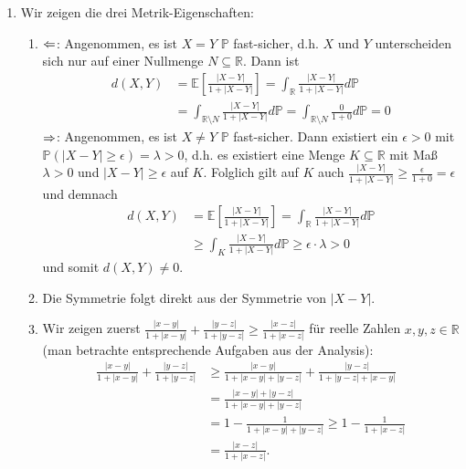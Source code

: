 \documentclass[a4paper]{article}
\begin{document}
\begin{enumerate}[label=(\alph*)]
    \item Wir zeigen die drei Metrik-Eigenschaften:
    \begin{enumerate}[label=(\roman*)]
        \item $\Leftarrow$: Angenommen, es ist $X = Y$ $\mathds{P}$ fast-sicher, d.h. $X$ und $Y$ unterscheiden sich nur auf einer Nullmenge $N \subseteq \mathds{R}$. Dann ist
        \begin{align*}
            d(X,Y) &= \mathds{E}\left[\frac{|X-Y|}{1 + |X-Y|}\right] = \int_\mathds{R} \frac{|X-Y|}{1 + |X-Y|} d\mathds{P}\\
            &= \int_{\mathds{R} \setminus N} \frac{|X-Y|}{1 + |X-Y|} d\mathds{P} = \int_{\mathds{R} \setminus N} \frac{0}{1 + 0} d\mathds{P} = 0
        \end{align*}
        $\Rightarrow$: Angenommen, es ist $X \neq Y$ $\mathds{P}$ fast-sicher.
        Dann existiert ein $\epsilon > 0$ mit $\mathds{P}(|X - Y| \geq \epsilon) = \lambda > 0$, d.h. es existiert eine Menge $K \subseteq \mathds{R}$ mit Maß $\lambda > 0$ und $|X-Y| \geq \epsilon$ auf $K$.
        Folglich gilt auf $K$ auch $\frac{|X-Y|}{1+ |X-Y|} \geq \frac{\epsilon}{1 + 0} = \epsilon$ und demnach
        \begin{align*}
            d(X,Y) &= \mathds{E}\left[ \frac{|X-Y|}{1+|X-Y|} \right] = \int_\mathds{R} \frac{|X-Y|}{1+|X-Y|} d\mathds{P} \\
            &\geq \int_K \frac{|X-Y|}{1+|X-Y|} d\mathds{P} \geq \epsilon \cdot \lambda > 0
        \end{align*}
        und somit $d(X,Y) \neq 0$.
        \item Die Symmetrie folgt direkt aus der Symmetrie von $|X-Y|$.
        \item Wir zeigen zuerst $\frac{|x-y|}{1 + |x-y|} + \frac{|y-z|}{1 + |y-z|} \geq \frac{|x-z|}{1+|x-z|}$ für reelle Zahlen $x,y,z \in \mathds{R}$ (man betrachte entsprechende Aufgaben aus der Analysis):
        \begin{align*}
            \frac{|x-y|}{1 + |x-y|} + \frac{|y-z|}{1 + |y-z|}  &\geq \frac{|x-y|}{1 + |x-y| + |y-z|} + \frac{|y-z|}{1 + |y-z| + |x-y|}\\
            &= \frac{|x-y| + |y-z|}{1 + |x-y| + |y-z|}\\
            &= 1 - \frac{1}{1 +|x-y| + |y-z| } \geq 1 - \frac{1}{1+|x-z|}\\
            &= \frac{|x-z|}{1 + |x-z|}\text{.}
        \end{align*}

\end{enumerate}
\end{enumerate}
\end{document}
